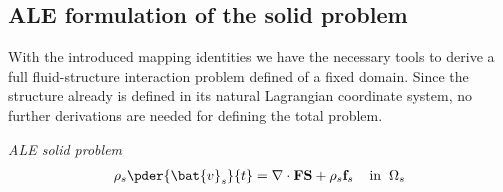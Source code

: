 \subsection{ALE formulation of the solid problem}

With the introduced mapping identities we have the necessary tools to derive a full fluid-structure interaction problem defined of a fixed domain. Since the structure already is defined in its natural Lagrangian coordinate system, no further derivations are needed for defining the total problem.

\begin{equat}
\textit{ALE solid problem}
\begin{align}
\rho_s \pder{\bat{v}_s}{t} = \nabla \cdot \mathbf{F}\mathbf{S} + \rho_s \mathbf{f}_s
\hspace{4mm} \text{in} \hspace{2mm} \Omega_s \\
\end{align}
\end{equat}



